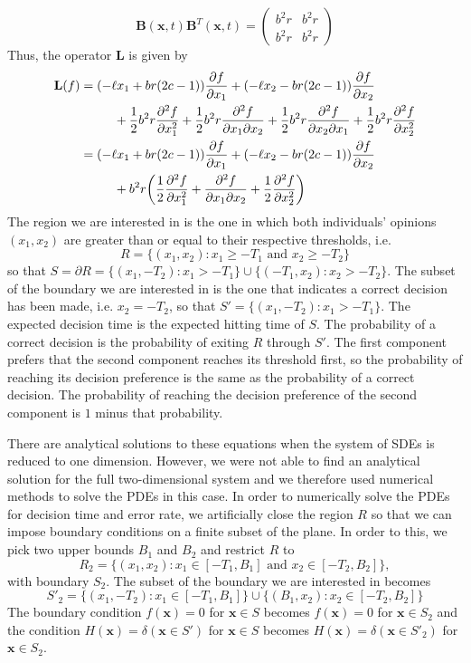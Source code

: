 \documentclass{article}
\newcommand{\mb}{\mathbf}
\begin{document}
\begin{equation*}
{\mb B}({\mb x},t){\mb B}^T({\mb x},t)
=\left(\begin{array}{ll}
b^2r & b^2r
\\ b^2r & b^2r
\end{array}\right)
\end{equation*}
Thus, the operator ${\mb L}$ is given by
\begin{align*}
{\mb L}(f)&=(-\ell x_1+br(2c-1))\frac{\partial f}{\partial x_1}+(-\ell x_2-br(2c-1))\frac{\partial f}{\partial x_2}\\&\ \ \ \ \ \ \ \ +\frac{1}{2}b^2r\frac{\partial^2 f}{\partial x_1^2}+\frac{1}{2}b^2r\frac{\partial^2 f}{\partial x_1\partial x_2}+\frac{1}{2}b^2r\frac{\partial^2 f}{\partial x_2\partial x_1}+\frac{1}{2}b^2r\frac{\partial^2 f}{\partial x_2^2} \notag
\\&=(-\ell x_1+br(2c-1))\frac{\partial f}{\partial x_1}+(-\ell x_2-br(2c-1))\frac{\partial f}{\partial x_2}\\&\ \ \ \ \ \ \ \ +b^2r\bigg(\frac{1}{2}\frac{\partial^2 f}{\partial x_1^2}+\frac{\partial^2 f}{\partial x_1\partial x_2}+\frac{1}{2}\frac{\partial^2 f}{\partial x_2^2} \bigg)
\end{align*}
The region we are interested in is the one in which both individuals' opinions $(x_1,x_2)$ are greater than or equal to their respective thresholds, i.e. $$R=\{(x_1,x_2): x_1\geq -T_1 \text{ and } x_2\geq -T_2\}$$ so that $S=\partial R=\{(x_1,-T_2): x_1>-T_1\}\cup\{(-T_1,x_2):x_2>-T_2\}$.  The subset of the boundary we are interested in is the one that indicates a correct decision has been made, i.e. $x_2=-T_2$, so that $S'=\{(x_1,-T_2):x_1>-T_1\}$. The expected decision time is the expected hitting time of $S$. The probability of a correct decision is the probability of exiting $R$ through $S'$. The first component prefers that the second component reaches its threshold first, so the probability of reaching its decision preference is the same as the probability of a correct decision. The probability of reaching the decision preference of the second component is $1$ minus that probability.

There are analytical solutions to these equations when the system of SDEs is reduced to one dimension. However, we were not able to find an analytical solution for the full two-dimensional system and we therefore used numerical methods to solve the PDEs in this case. In order to  numerically solve the PDEs for decision time and error rate, we artificially close the region $R$ so that we can impose boundary conditions on a finite subset of the plane. In order to this, we pick two upper bounds $B_1$ and $B_2$ and restrict $R$ to $$R_2=\{(x_1,x_2): x_1\in [-T_1,B_1] \text{ and } x_2\in[ -T_2,B_2]\},$$ with boundary $S_2$. The subset of the boundary we are interested in becomes 
$$S'_2=\{(x_1,-T_2):x_1\in [-T_1,B_1]\}\cup\{(B_1,x_2):x_2\in [-T_2,B_2]\}$$
The boundary condition $f({\mb x})=0$ for ${\mb x}\in S$ becomes $f({\mb x})=0$ for ${\mb x}\in S_2$ and the condition $H({\mb x})=\delta({\mb x}\in S')$ for ${\mb x}\in S$ becomes $H({\mb x})=\delta({\mb x}\in S'_2)$ for ${\mb x}\in S_2$.
\end{document}
